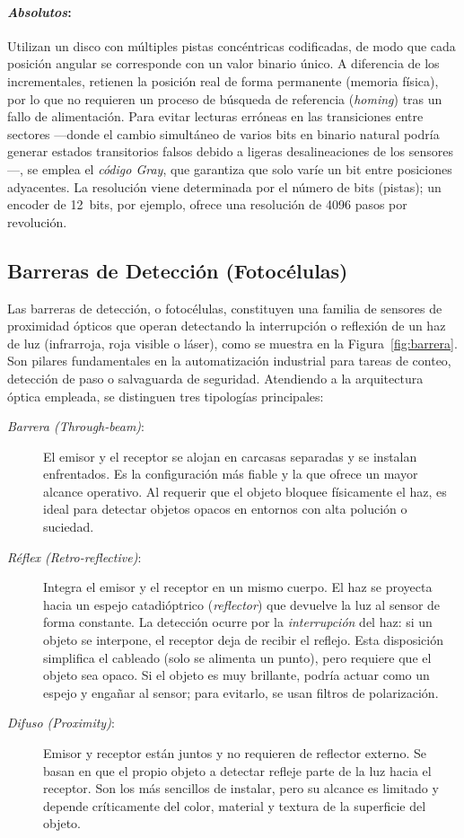     \paragraph{\emph{Absolutos}:} Utilizan un disco con múltiples pistas concéntricas codificadas, de modo que cada posición angular se corresponde con un valor binario único. A diferencia de los incrementales, retienen la posición real de forma permanente (memoria física), por lo que no requieren un proceso de búsqueda de referencia (\textit{homing}) tras un fallo de alimentación. Para evitar lecturas erróneas en las transiciones entre sectores —donde el cambio simultáneo de varios bits en binario natural podría generar estados transitorios falsos debido a ligeras desalineaciones de los sensores—, se emplea el \emph{código Gray}, que garantiza que solo varíe un bit entre posiciones adyacentes. La resolución viene determinada por el número de bits (pistas); un encoder de 12~bits, por ejemplo, ofrece una resolución de \num{4096} pasos por revolución.


\subsection{Barreras de Detección (Fotocélulas)}\label{sub:barreras}

Las barreras de detección, o fotocélulas, constituyen una familia de sensores de proximidad ópticos que operan detectando la interrupción o reflexión de un haz de luz (infrarroja, roja visible o láser), como se muestra en la Figura~\ref{fig:barrera}. Son pilares fundamentales en la automatización industrial para tareas de conteo, detección de paso o salvaguarda de seguridad. Atendiendo a la arquitectura óptica empleada, se distinguen tres tipologías principales:

\begin{description}
    \item[\emph{Barrera (Through-beam)}:] El emisor y el receptor se alojan en carcasas separadas y se instalan enfrentados. Es la configuración más fiable y la que ofrece un mayor alcance operativo. Al requerir que el objeto bloquee físicamente el haz, es ideal para detectar objetos opacos en entornos con alta polución o suciedad.
    \item[\emph{Réflex (Retro-reflective)}:] Integra el emisor y el receptor en un mismo cuerpo. El haz se proyecta hacia un espejo catadióptrico (\textit{reflector}) que devuelve la luz al sensor de forma constante. La detección ocurre por la \emph{interrupción} del haz: si un objeto se interpone, el receptor deja de recibir el reflejo. Esta disposición simplifica el cableado (solo se alimenta un punto), pero requiere que el objeto sea opaco. Si el objeto es muy brillante, podría actuar como un espejo y engañar al sensor; para evitarlo, se usan filtros de polarización.
    \item[\emph{Difuso (Proximity)}:] Emisor y receptor están juntos y no requieren de reflector externo. Se basan en que el propio objeto a detectar refleje parte de la luz hacia el receptor. Son los más sencillos de instalar, pero su alcance es limitado y depende críticamente del color, material y textura de la superficie del objeto.
\end{description}

